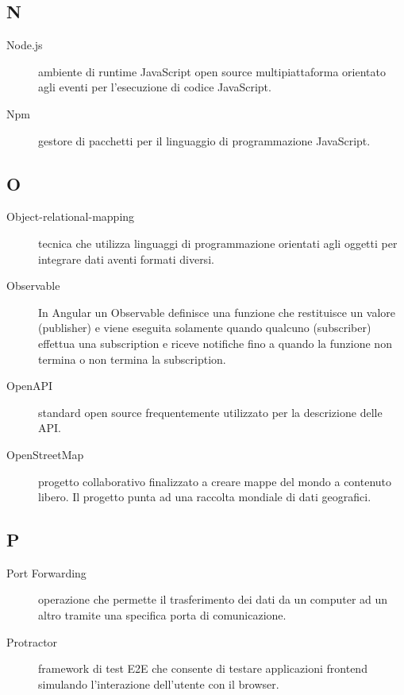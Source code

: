 \documentclass[../manuale-manutentore.tex]{subfiles}
\begin{document}
\subsection{N}

\begin{description}
  \item[Node.js] ambiente di runtime JavaScript open source multipiattaforma orientato agli eventi per l'esecuzione di codice JavaScript.
  \item[Npm] gestore di pacchetti per il linguaggio di programmazione JavaScript.
\end{description}

\subsection{O}

\begin{description}
    \item[Object-relational-mapping] tecnica che utilizza linguaggi di programmazione orientati agli oggetti per integrare dati aventi formati diversi.
    \item[Observable] In Angular un Observable definisce una funzione che restituisce un valore (publisher) e viene eseguita solamente quando qualcuno (subscriber) effettua una subscription e riceve notifiche fino a quando la funzione non termina o non termina la subscription.
    \item[OpenAPI] standard open source frequentemente utilizzato per la descrizione delle API\@.
    \item[OpenStreetMap] progetto collaborativo finalizzato a creare mappe del mondo a contenuto libero. Il progetto punta ad una raccolta mondiale di dati geografici.
\end{description}

\subsection{P}

\begin{description}
    \item[Port Forwarding] operazione che permette il trasferimento dei dati da un computer ad un altro tramite una specifica porta di comunicazione.
    \item[Protractor] framework di test E2E che consente di testare applicazioni frontend simulando l'interazione dell'utente con il browser.
\end{description}
\end{document}
